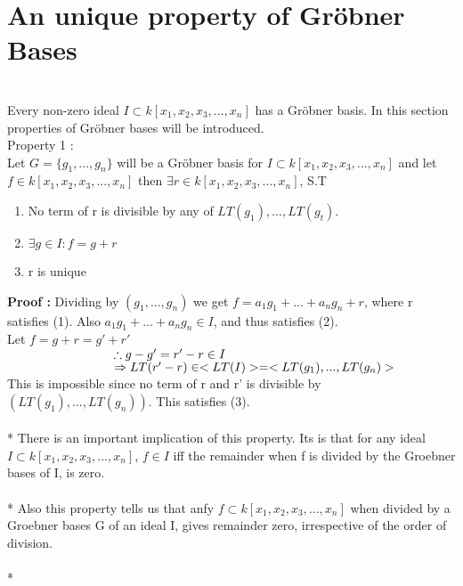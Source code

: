 \documentclass[12pt]{article}
\begin{document}
\section{An unique property of Gr\"{o}bner Bases}
\\
Every non-zero ideal $I \subset  k[x_{1},x_{2},x_{3},...,x_{n}]$ has a Gr\"{o}bner basis. In this section properties of Gr\"{o}bner bases will be introduced.\\
Property 1 :\\
Let $G=\{g_{1},...,g_{n}\}$ will be a Gr\"{o}bner basis for $I \subset  k[x_{1},x_{2},x_{3},...,x_{n}]$ and let $f \in k[x_{1},x_{2},x_{3},...,x_{n}]$ then 
$\exists r \in k[x_{1},x_{2},x_{3},...,x_{n}]$, S.T
\begin{enumerate}
\item No term of r is divisible by any of $LT(g_{1}),...,LT(g_{t})$.
\item $\exists g \in I : f=g+r$
\item r is unique
\end{enumerate} 
{\bf Proof :} Dividing by $(g_{1},...,g_{n})$ we get $f = a_{1}g_{1}+...+a_{n}g_{n} + r$, where r satisfies (1). Also $a_{1}g_{1}+...+a_{n}g_{n} \in I$, and thus satisfies (2).\\
Let $f=g+r = g'+r'$\\
$\hspace{30 mm} \therefore  g-g'=r'-r \in I$\\
$\hspace{30 mm} \Rightarrow LT(r'-r) \in <LT(I)> = < LT(g_{1}),...,LT(g_{n})>$\\
This is impossible since no term of r and r' is divisible by $(LT(g_{1}),...,LT(g_{n}))$. This satisfies (3).\\
\\*
There is an important implication of this property. Its is that for any ideal $I \subset  k[x_{1},x_{2},x_{3},...,x_{n}]$, $f \in I$ iff the remainder when f is divided by the Groebner bases of I, is zero.\\\\*
Also this property tells us that anfy $f \subset  k[x_{1},x_{2},x_{3},...,x_{n}]$ when divided by a Groebner bases G of an ideal I, gives remainder zero, irrespective of the order of division.\\
\\*
\newpage
{}
\end{document}
